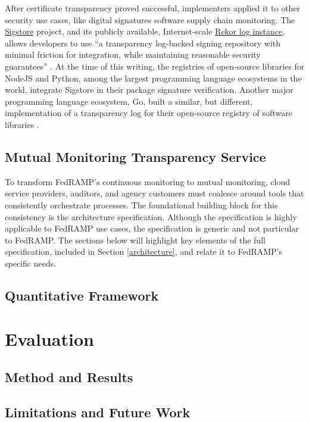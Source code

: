 \documentclass{jdf}
\begin{document}
After certificate transparency proved successful, implementers applied it to other security use cases, like digital signatures software supply chain monitoring. The \href{https://sigstore.dev}{Sigstore} project, and its publicly available, Internet-scale \href{https://rekor.sigstore.dev/}{Rekor log instance}, allows developers to use ``a transparency log-backed signing repository with minimal friction for integration, while maintaining reasonable security guarantees'' \cite[p.~2365]{newman22}. At the time of this writing, the registries of open-source libraries for NodeJS and Python, among the largest programming language ecosystems in the world, integrate Sigstore in their package signature verification. Another major programming language ecosystem, Go, built a similar, but different, implementation of a transparency log for their open-source registry of software libraries \cite{hockman19}.

\subsection{Mutual Monitoring Transparency Service}

To transform FedRAMP's continuous monitoring to mutual monitoring, cloud service providers, auditors, and agency customers must coalesce around tools that consistently orchestrate processes. The foundational building block for this consistency is the architecture specification. Although the specification is highly applicable to FedRAMP use cases, the specification is generic and not particular to FedRAMP. The sections below will highlight key elements of the full specification, included in Section \ref{architecture}, and relate it to FedRAMP's specific needs.

\subsection{Quantitative Framework}

\section{Evaluation}

\subsection{Method and Results}

\subsection{Limitations and Future Work}
\end{document}
